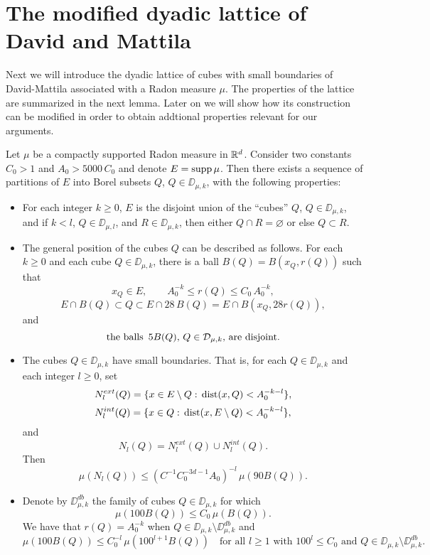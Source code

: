 \section{The modified dyadic lattice of David and Mattila}\label{sec:DMlatt}\label{sec5}

Next we will introduce the dyadic lattice of cubes
with small boundaries of David-Mattila \cite{David-Mattila} associated with a Radon measure $\mu$. The properties of the lattice are summarized in the next lemma. Later on we will show how its construction
can be modified in order to obtain addtional properties relevant for our arguments.



\begin{lemma}
	\label{lemcubs}
	Let $\mu$ be a compactly supported Radon measure in ${\mathbb R}^{d}$.
	Consider two constants $C_0>1$ and $A_0>5000\,C_0$ and denote $E=\operatorname{supp}\mu$. 
	Then there exists a sequence of partitions of $E$ into
	Borel subsets $Q$, $Q\in \DD_{\mu,k}$, with the following properties:
	\begin{itemize}
		\item For each integer $k\geq0$, $E$ is the disjoint union of the ``cubes'' $Q$, $Q\in\DD_{\mu,k}$, and
		if $k<l$, $Q\in\DD_{\mu,l}$, and $R\in\DD_{\mu,k}$, then either $Q\cap R=\varnothing$ or else $Q\subset R$.
		\vv
		
		\item The general position of the cubes $Q$ can be described as follows. For each $k\geq0$ and each cube $Q\in\DD_{\mu,k}$, there is a ball $B(Q)=B(x_Q,r(Q))$ such that
		$$x_Q\in E, \qquad A_0^{-k}\leq r(Q)\leq C_0\,A_0^{-k},$$
		$$E\cap B(Q)\subset Q\subset E\cap 28\,B(Q)=E \cap B(x_Q,28r(Q)),$$
		and
		$$\mbox{the balls\, $5B(Q)$, $Q\in{\mathcal D}_{\mu,k}$, are disjoint.}$$
		
		\vv
		\item The cubes $Q\in\DD_{\mu,k}$ have small boundaries. That is, for each $Q\in\DD_{\mu,k}$ and each
		integer $l\geq0$, set
		$$N_l^{ext}(Q)= \{x\in E\setminus Q:\,{\rm dist}(x,Q)< A_0^{-k-l}\},$$
		$$N_l^{int}(Q)= \{x\in Q:\,{\rm dist}(x,E\setminus Q)< A_0^{-k-l}\},$$
		and
		$$N_l(Q)= N_l^{ext}(Q) \cup N_l^{int}(Q).$$
		Then
		\begin{equation}\label{eqsmb2}
			\mu(N_l(Q))\leq (C^{-1}C_0^{-3d-1}A_0)^{-l}\,\mu(90B(Q)).
		\end{equation}
		\vv
		
		\item Denote by $\DD_{\mu,k}^{db}$ the family of cubes $Q\in\DD_{\mu,k}$ for which
		\begin{equation}\label{eqdob22}
			\mu(100B(Q))\leq C_0\,\mu(B(Q)).
		\end{equation}
		We have that $r(Q)=A_0^{-k}$ when $Q\in\DD_{\mu,k}\setminus \DD_{\mu,k}^{db}$
		and
		\begin{equation}\label{eqdob23}
			\mu(100B(Q))\leq C_0^{-l}\,\mu(100^{l+1}B(Q))\quad
			\mbox{for all $l\geq1$ with $100^l\leq C_0$ and $Q\in\DD_{\mu,k}\setminus \DD_{\mu,k}^{db}$.}
		\end{equation}
	\end{itemize}
\end{lemma}

